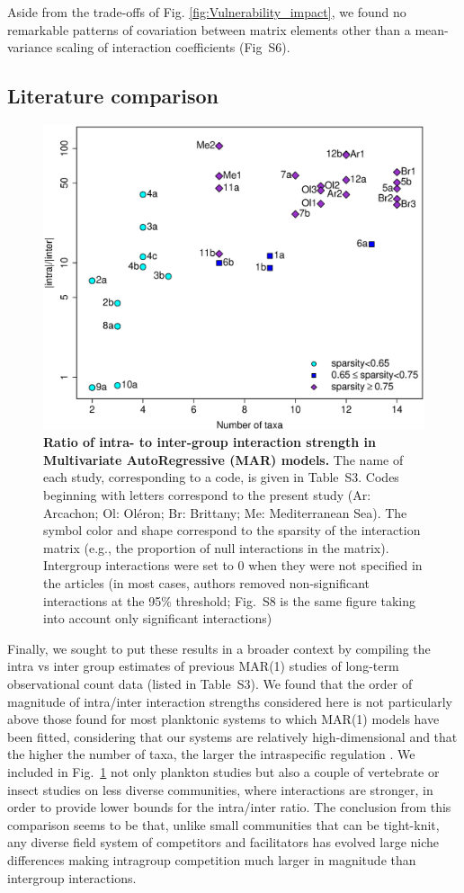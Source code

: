 \documentclass[10pt]{article}
\begin{document}
Aside from the trade-offs of Fig. \ref{fig:Vulnerability_impact},
we found no remarkable patterns of covariation between matrix elements
other than a mean-variance scaling of interaction coefficients (Fig~S6).

\subsection*{Literature comparison}

\begin{figure}[!h]
\centering \includegraphics[width=0.8\linewidth]{Ratio_function_dim}
\caption{\textbf{Ratio of intra- to inter-group interaction strength in Multivariate
AutoRegressive (MAR) models.} The name of each study,
corresponding to a code, is given in Table~S3. Codes beginning
with letters correspond to the present study (Ar: Arcachon; Ol: Oléron; Br: Brittany; Me: Mediterranean Sea). The symbol color and
shape correspond to the sparsity of the interaction matrix (e.g.,
the proportion of null interactions in the matrix). Intergroup interactions
were set to 0 when they were not specified in the articles (in most
cases, authors removed non-significant interactions at the 95\% threshold;
Fig.~S8 is the same figure taking into account only significant interactions)}
\label{fig:meta_ratio} 
\end{figure}

Finally, we sought to put these results in a broader context by compiling
the intra vs inter group estimates of previous MAR(1) studies of long-term
observational count data (listed in Table~S3). We found that the
order of magnitude of intra/inter interaction strengths considered
here is not particularly above those found for most planktonic systems
to which MAR(1) models have been fitted, considering that our systems
are relatively high-dimensional and that the higher the number of
taxa, the larger the intraspecific regulation \citep{barabas_self-regulation_2017}.
We included in Fig.~\ref{fig:meta_ratio} not only plankton studies
but also a couple of vertebrate or insect studies on less diverse
communities, where interactions are stronger, in order to provide lower bounds for the intra/inter ratio. The conclusion from
this comparison seems to be that, unlike small communities that can
be tight-knit, any diverse field system of competitors and facilitators
has evolved large niche differences making intragroup competition
much larger in magnitude than intergroup interactions.
\end{document}
